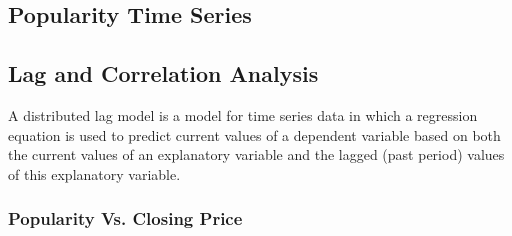 \documentclass[sigconf, nonacm]{acmart}
\begin{document}
\subsection{Popularity Time Series} 



\subsection{Lag and Correlation Analysis} 
A distributed lag model is a model for time series data in which a regression equation is used to predict current values of a dependent variable based on both the current values of an explanatory variable and the lagged (past period) values of this explanatory variable.
\subsubsection{Popularity Vs. Closing Price}
\end{document}
